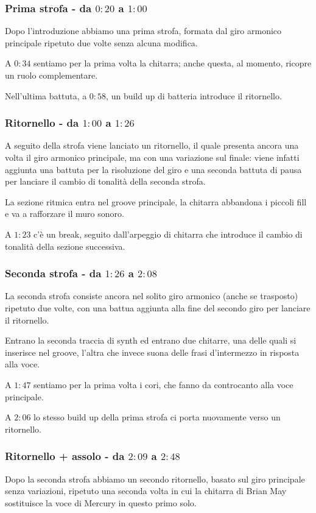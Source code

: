 \documentclass[12pt]{article}
\begin{document}
\subsubsection*{Prima strofa - da \(0:20\) a \(1:00\)}
Dopo l'introduzione abbiamo una prima strofa, formata dal giro armonico principale ripetuto due volte senza alcuna modifica.

A \(0:34\) sentiamo per la prima volta la chitarra; anche questa, al momento, ricopre un ruolo complementare.

Nell'ultima battuta, a \(0:58\), un build up di batteria introduce il ritornello.

\subsubsection*{Ritornello - da \(1:00\) a \(1:26\)}
A seguito della strofa viene lanciato un ritornello, il quale presenta ancora una volta il giro armonico principale, ma con una variazione sul finale: viene infatti aggiunta una battuta per la risoluzione del giro e una seconda battuta di pausa per lanciare il cambio di tonalità della seconda strofa.

La sezione ritmica entra nel groove principale, la chitarra abbandona i piccoli fill e va a rafforzare il muro sonoro.

A \(1:23\) c'è un break, seguito dall'arpeggio di chitarra che introduce il cambio di tonalità della sezione successiva.

\subsubsection*{Seconda strofa - da \(1:26\) a \(2:08\)}
La seconda strofa consiste ancora nel solito giro armonico (anche se trasposto) ripetuto due volte, con una battua aggiunta alla fine del secondo giro per lanciare il ritornello.

Entrano la seconda traccia di synth ed entrano due chitarre, una delle quali si inserisce nel groove, l'altra che invece suona delle frasi d'intermezzo in risposta alla voce.

A \(1:47\) sentiamo per la prima volta i cori, che fanno da controcanto alla voce principale.

A \(2:06\) lo stesso build up della prima strofa ci porta nuovamente verso un ritornello.

\subsubsection*{Ritornello + assolo - da \(2:09\) a \(2:48\)}
Dopo la seconda strofa abbiamo un secondo ritornello, basato sul giro principale senza variazioni, ripetuto una seconda volta in cui la chitarra di Brian May sostituisce la voce di Mercury in questo primo solo.
\end{document}
